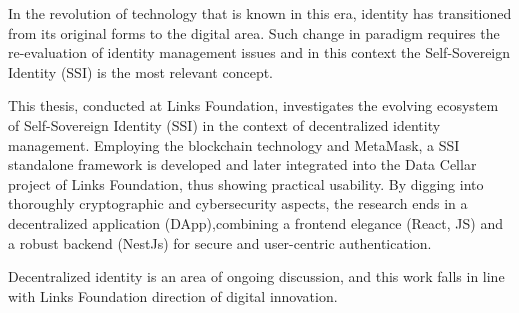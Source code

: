 \sommario
In the revolution of technology that is known in this era, identity has transitioned from its original forms to the digital area. Such change in paradigm requires the 
re-evaluation of identity management issues and in this context the Self-Sovereign Identity (SSI) is the most relevant concept.

This thesis, conducted at Links Foundation, investigates the evolving ecosystem of Self-Sovereign Identity (SSI) in the context of decentralized identity management. 
Employing the blockchain technology and MetaMask, a SSI standalone framework is developed and later integrated into the Data Cellar project of Links Foundation, thus showing practical usability.
By digging into thoroughly cryptographic and cybersecurity aspects, the research ends in a decentralized application (DApp),combining a frontend 
elegance (React, JS) and a robust backend (NestJs) for secure and user-centric authentication.

Decentralized identity is an area of ongoing discussion, and this work falls in line with Links Foundation direction of digital innovation.